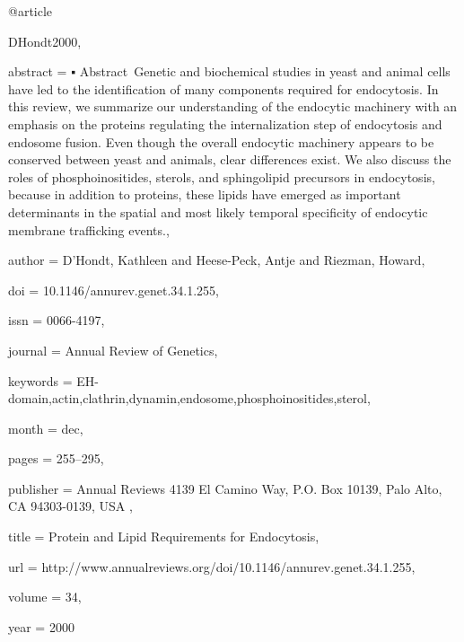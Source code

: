 @article{DHondt2000,

abstract = {▪ Abstract Genetic and biochemical studies in yeast and animal cells have led to the identification of many components required for endocytosis. In this review, we summarize our understanding of the endocytic machinery with an emphasis on the proteins regulating the internalization step of endocytosis and endosome fusion. Even though the overall endocytic machinery appears to be conserved between yeast and animals, clear differences exist. We also discuss the roles of phosphoinositides, sterols, and sphingolipid precursors in endocytosis, because in addition to proteins, these lipids have emerged as important determinants in the spatial and most likely temporal specificity of endocytic membrane trafficking events.},

author = {D'Hondt, Kathleen and Heese-Peck, Antje and Riezman, Howard},

doi = {10.1146/annurev.genet.34.1.255},

issn = {0066-4197},

journal = {Annual Review of Genetics},

keywords = {EH-domain,actin,clathrin,dynamin,endosome,phosphoinositides,sterol},

month = {dec},

pages = {255--295},

publisher = { Annual Reviews  4139 El Camino Way, P.O. Box 10139, Palo Alto, CA 94303-0139, USA  },

title = {{Protein and Lipid Requirements for Endocytosis}},

url = {http://www.annualreviews.org/doi/10.1146/annurev.genet.34.1.255},

volume = {34},

year = {2000}

}

